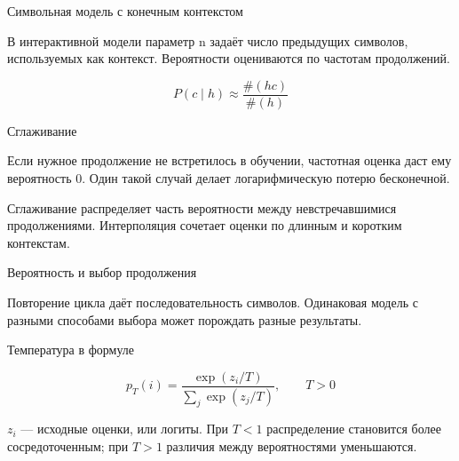 \documentclass[aspectratio=169,12pt]{beamer}
\begin{document}
\begin{frame}{Символьная модель с конечным контекстом}
\color{ink}
{\small В интерактивной модели параметр n задаёт число предыдущих символов, используемых как контекст. Вероятности оцениваются по частотам продолжений.
\par\vspace{0.6em}\[\displaystyle P(c\mid h)\approx\frac{\#(hc)}{\#(h)}\]}
\end{frame}

\begin{frame}{Сглаживание}
\color{ink}
{\small Если нужное продолжение не встретилось в обучении, частотная оценка даст ему вероятность 0. Один такой случай делает логарифмическую потерю бесконечной.
\par\vspace{0.6em}Сглаживание распределяет часть вероятности между невстречавшимися продолжениями. Интерполяция сочетает оценки по длинным и коротким контекстам.}
\end{frame}

\begin{frame}{Вероятность и выбор продолжения}
\color{ink}
\begin{center}\end{center}{\small Повторение цикла даёт последовательность символов. Одинаковая модель с разными способами выбора может порождать разные результаты.}
\end{frame}

\begin{frame}{Температура в формуле}
\color{ink}
{\small \[\displaystyle p_T(i)=\frac{\exp(z_i/T)}{\sum_j\exp(z_j/T)},\qquad T>0\]
\par\vspace{0.6em}$z_i$ — исходные оценки, или логиты. При $T<1$ распределение становится более сосредоточенным; при $T>1$ различия между вероятностями уменьшаются.}
\end{frame}
\end{document}
